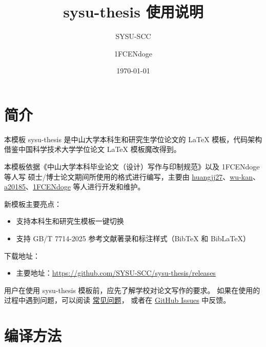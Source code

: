 \documentclass[a4paper]{ltxdoc}
\DeclareRobustCommand\pkg{\textsf}
\DeclareRobustCommand\cls{\textsf}
\begin{document}
\title{\cls{sysu-thesis} 使用说明}
\author{SYSU-SCC \and 1FCENdoge}
\renewcommand{\thefootnote}{\fnsymbol{footnote}}
\date{\today}
\maketitle



\section{简介}

本模板 \cls{sysu-thesis} 是中山大学本科生和研究生学位论文的 \LaTeX{}
模板，代码架构借鉴中国科学技术大学学位论文 \LaTeX{}
模板魔改得到。

本模板依据《中山大学本科毕业论文（设计）写作与印制规范》以及 1FCENdoge 等人写
硕士/博士论文期间所使用的格式进行编写，主要由 
\href{https://github.com/huangjj27}{huangjj27}、\href{https://github.com/wu-kan}{wu-kan}、
\href{https://github.com/a20185}{a20185}、\href{https://github.com/1FCENdoge}{1FCENdoge} 
等人进行开发和维护。

新模板主要亮点：
\begin{itemize}
  \item 支持本科生和研究生模板一键切换
  \item 支持 GB/T 7714-2025 参考文献著录和标注样式（BibTeX 和 BibLaTeX）
\end{itemize}

下载地址：
\begin{itemize}
  \item 主要地址：\url{https://github.com/SYSU-SCC/sysu-thesis/releases}
\end{itemize}

用户在使用 \pkg{sysu-thesis} 模板前，应先了解学校对论文写作的要求。
如果在使用的过程中遇到问题，可以阅读
\href{https://github.com/ustctug/ustcthesis/wiki}{常见问题}，
或者在 \href{https://github.com/SYSU-SCC/sysu-thesis/issues}{GitHub Issues}
中反馈。



\section{编译方法}
\end{document}
